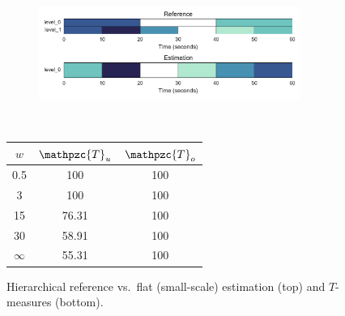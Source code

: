 \documentclass{article}
\def\shag{\ensuremath{\mathpzc{T}}}
\begin{document}
\begin{figure}[t]
  \centering
  \begin{subfigure}{0.5\textwidth}
    \centering
    \includegraphics[width=0.94\textwidth]{figs/hier-flatsmall.pdf}
  \end{subfigure}%
  \\
  \begin{minipage}{0.5\textwidth}
    \centering
    \vspace{10pt}
    \begin{tabular}{|c|c|c|}
      \hline
      $w$       & $\shag_u$    & $\shag_o$      \\
      \hline
      0.5       & 100       & 100      \\     
      3         & 100       & 100      \\
      15        & 76.31     & 100    \\
      30        & 58.91     & 100    \\
      $\infty$  & 55.31     & 100    \\
      \hline
    \end{tabular}
  \end{minipage}
  \caption{Hierarchical reference vs.\ flat (small-scale) estimation (top) and $T$-measures (bottom).}
  \label{fig:hier-flatsmall}
\end{figure}
\end{document}
